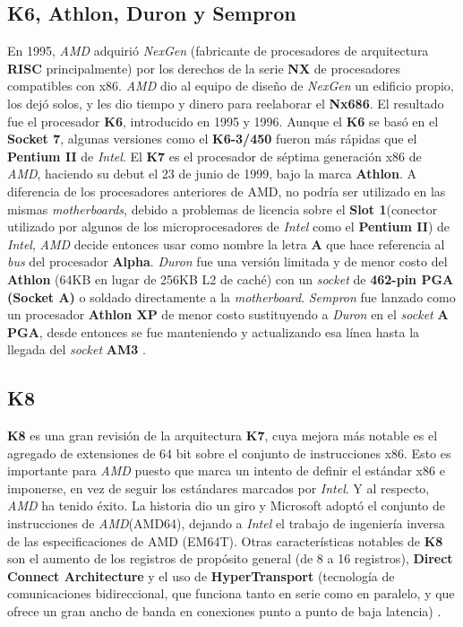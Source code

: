 \subsection{K6, Athlon, Duron y Sempron}
En 1995, \emph{AMD} adquirió \emph{NexGen} (fabricante de procesadores de arquitectura \textbf{RISC} principalmente) por los derechos de la serie \textbf{NX} de procesadores compatibles con x86. 
\emph{AMD} dio al equipo de diseño de \emph{NexGen} un edificio propio, los dejó solos, y les dio tiempo y dinero para reelaborar el \textbf{Nx686}. El resultado fue el procesador \textbf{K6}, 
introducido en 1995 y 1996. Aunque el \textbf{\textbf{K6}} se basó en el \textbf{Socket 7}, algunas versiones como el \textbf{K6-3/450} fueron más rápidas que el \textbf{Pentium II} de \emph{Intel}. 
El \textbf{K7} es el procesador de séptima generación x86 de \emph{AMD}, haciendo su debut el 23 de junio de 1999, bajo la marca \textbf{Athlon}. A diferencia de los procesadores anteriores de AMD, 
no podría ser utilizado en las mismas \emph{motherboards}, debido a problemas de licencia sobre el \textbf{Slot 1}(conector utilizado por algunos de los microprocesadores de \emph{Intel} como el \textbf{Pentium II})  
de \emph{Intel}, \emph{AMD} decide entonces usar como nombre la letra \textbf{A} que hace referencia al \emph{bus} del procesador \textbf{Alpha}. \emph{Duron} fue una versión limitada y de menor costo del \textbf{Athlon} (64KB en 
lugar de 256KB L2 de caché) con un \emph{socket} de \textbf{462-pin PGA (Socket A)} o soldado directamente a la \emph{motherboard}. \emph{Sempron} fue lanzado como un procesador \textbf{Athlon XP} de menor 
costo sustituyendo a \emph{Duron} en el \emph{socket} \textbf{A PGA}, desde entonces se fue manteniendo y actualizando esa línea hasta la llegada del  \emph{socket} \textbf{AM3}
.

\subsection{K8}
\textbf{K8} es una gran revisión de la arquitectura \textbf{K7}, cuya mejora más notable es el agregado de extensiones de 64 bit sobre el conjunto de instrucciones x86. Esto es importante para \emph{AMD} puesto 
que marca un intento de definir el estándar x86 e imponerse, en vez de seguir los estándares marcados por \emph{Intel}. Y al respecto, \emph{AMD} ha tenido éxito. La historia dio un giro y 
Microsoft adoptó el conjunto de instrucciones de \emph{AMD}(AMD64), dejando a \emph{Intel} el trabajo de ingeniería inversa de las especificaciones de AMD (EM64T). Otras características notables de \textbf{K8} 
son el aumento de los registros de propósito general (de 8 a 16 registros), \textbf{Direct Connect Architecture} y el uso de \textbf{HyperTransport}
(tecnología de comunicaciones bidireccional, que funciona tanto en serie como en paralelo, y que ofrece un gran ancho de banda en conexiones punto a punto de baja latencia)
.




